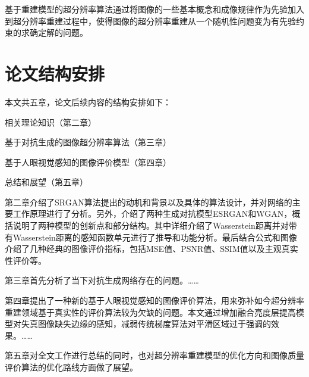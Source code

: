 基于重建模型的超分辨率算法通过将图像的一些基本概念和成像规律作为先验加入到超分辨率重建过程中，使得图像的超分辨率重建从一个随机性问题变为有先验约束的求确定解的问题。




\section{论文结构安排}

本文共五章，论文后续内容的结构安排如下：

相关理论知识（第二章）

基于对抗生成的图像超分辨率算法（第三章）

基于人眼视觉感知的图像评价模型（第四章）

总结和展望（第五章）

第二章介绍了SRGAN算法提出的动机和背景以及具体的算法设计，并对网络的主要工作原理进行了分析。另外，介绍了两种生成对抗模型ESRGAN和WGAN，概括说明了两种模型的创新点和部分结构。其中详细介绍了Wasserstein距离并对带有Wasserstein距离的感知函数单元进行了推导和功能分析。最后结合公式和图像介绍了几种经典的图像评价指标，包括MSE值、PSNR值、SSIM值以及主观真实性评价等。


第三章首先分析了当下对抗生成网络存在的问题。……

第四章提出了一种新的基于人眼视觉感知的图像评价算法，用来弥补如今超分辨率重建领域基于真实性的评价算法较为欠缺的问题。本文通过增加融合亮度层提高模型对失真图像缺失边缘的感知，减弱传统梯度算法对平滑区域过于强调的效果。……

第五章对全文工作进行总结的同时，也对超分辨率重建模型的优化方向和图像质量评价算法的优化路线方面做了展望。
